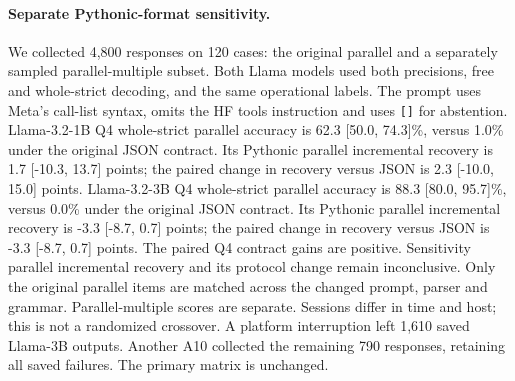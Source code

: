 \paragraph{Separate Pythonic-format sensitivity.} We collected 4,800 responses on 120 cases: the original parallel and a separately sampled parallel-multiple subset. Both Llama models used both precisions, free and whole-strict decoding, and the same operational labels. The prompt uses Meta's call-list syntax, omits the HF tools instruction and uses \texttt{[]} for abstention. Llama-3.2-1B Q4 whole-strict parallel accuracy is 62.3 [50.0, 74.3]\%, versus 1.0\% under the original JSON contract. Its Pythonic parallel incremental recovery is 1.7 [-10.3, 13.7] points; the paired change in recovery versus JSON is 2.3 [-10.0, 15.0] points. Llama-3.2-3B Q4 whole-strict parallel accuracy is 88.3 [80.0, 95.7]\%, versus 0.0\% under the original JSON contract. Its Pythonic parallel incremental recovery is -3.3 [-8.7, 0.7] points; the paired change in recovery versus JSON is -3.3 [-8.7, 0.7] points. The paired Q4 contract gains are positive. Sensitivity parallel incremental recovery and its protocol change remain inconclusive. Only the original parallel items are matched across the changed prompt, parser and grammar. Parallel-multiple scores are separate. Sessions differ in time and host; this is not a randomized crossover. A platform interruption left 1,610 saved Llama-3B outputs. Another A10 collected the remaining 790 responses, retaining all saved failures. The primary matrix is unchanged.
